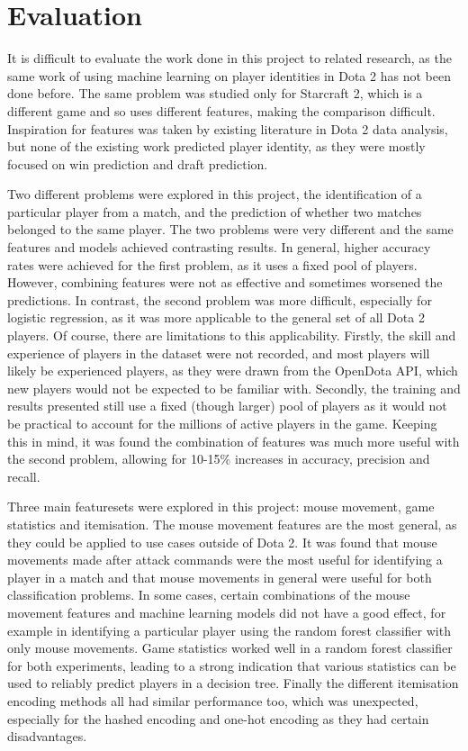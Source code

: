 \documentclass[Report.tex]{subfiles}
\begin{document}
\section{Evaluation}

It is difficult to evaluate the work done in this project to related research, as the same work of using machine learning on player identities in Dota 2 has not been done before. The same problem was studied only for Starcraft 2, which is a different game and so uses different features, making the comparison difficult. Inspiration for features was taken by existing literature in Dota 2 data analysis, but none of the existing work predicted player identity, as they were mostly focused on win prediction and draft prediction. 

Two different problems were explored in this project, the identification of a particular player from a match, and the prediction of whether two matches belonged to the same player. The two problems were very different and the same features and models achieved contrasting results. In general, higher accuracy rates were achieved for the first problem, as it uses a fixed pool of players. However, combining features were not as effective and sometimes worsened the predictions. In contrast, the second problem was more difficult, especially for logistic regression, as it was more applicable to the general set of all Dota 2 players. Of course, there are limitations to this applicability. Firstly, the skill and experience of players in the dataset were not recorded, and most players will likely be experienced players, as they were drawn from the OpenDota API, which new players would not be expected to be familiar with. Secondly, the training and results presented still use a fixed (though larger) pool of players as it would not be practical to account for the millions of active players in the game. Keeping this in mind, it was found the combination of features was much more useful with the second problem, allowing for 10-15\% increases in accuracy, precision and recall. 

Three main featuresets were explored in this project: mouse movement, game statistics and itemisation. The mouse movement features are the most general, as they could be applied to use cases outside of Dota 2. It was found that mouse movements made after attack commands were the most useful for identifying a player in a match and that mouse movements in general were useful for both classification problems. In some cases, certain combinations of the mouse movement features and machine learning models did not have a good effect, for example in identifying a particular player using the random forest classifier with only mouse movements. Game statistics worked well in a random forest classifier for both experiments, leading to a strong indication that various statistics can be used to reliably predict players in a decision tree. Finally the different itemisation encoding methods all had similar performance too, which was unexpected, especially for the hashed encoding and one-hot encoding as they had certain disadvantages.
\end{document}
